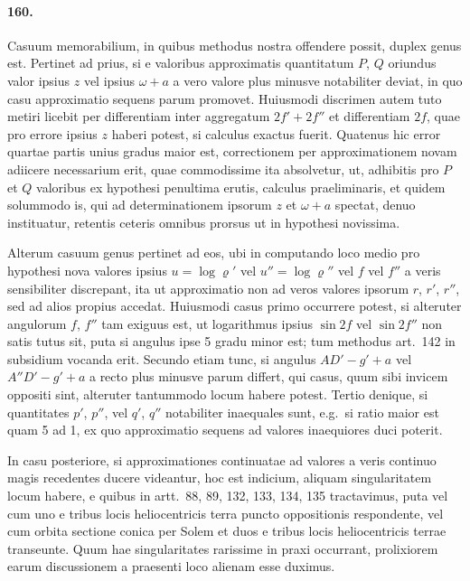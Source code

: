\documentclass[12pt,a4paper]{article}
\begin{document}
\paragraph{160.}
Casuum memorabilium, in quibus methodus nostra offendere possit, duplex genus est. Pertinet ad prius, si e valoribus approximatis quantitatum $P$, $Q$ oriundus valor ipsius $z$ vel ipsius $\omega + a$ a vero valore plus minusve notabiliter deviat, in quo casu approximatio sequens parum promovet. Huiusmodi discrimen autem tuto metiri licebit per differentiam inter aggregatum $2f' + 2f''$ et differentiam $2f$, quae pro errore ipsius $z$ haberi potest, si calculus exactus fuerit. Quatenus hic error quartae partis unius gradus maior est, correctionem per approximationem novam adiicere necessarium erit, quae commodissime ita absolvetur, ut, adhibitis pro $P$ et $Q$ valoribus ex hypothesi penultima erutis, calculus praeliminaris, et quidem solummodo is, qui ad determinationem ipsorum $z$ et $\omega + a$ spectat, denuo instituatur, retentis ceteris omnibus prorsus ut in hypothesi novissima.

Alterum casuum genus pertinet ad eos, ubi in computando loco medio pro hypothesi nova valores ipsius $u = \log\varrho'$ vel $u'' = \log\varrho''$ vel $f$ vel $f''$ a veris sensibiliter discrepant, ita ut approximatio non ad veros valores ipsorum $r$, $r'$, $r''$, sed ad alios propius accedat. Huiusmodi casus primo occurrere potest, si alteruter angulorum $f$, $f''$ tam exiguus est, ut logarithmus ipsius $\sin 2f$ vel $\sin 2f''$ non satis tutus sit, puta si angulus ipse 5 gradu minor est; tum methodus art.~142 in subsidium vocanda erit. Secundo etiam tunc, si angulus $AD' - g' + a$ vel $A''D' - g' + a$ a recto plus minusve parum differt, qui casus, quum sibi invicem oppositi sint, alteruter tantummodo locum habere potest. Tertio denique, si quantitates $p'$, $p''$, vel $q'$, $q''$ notabiliter inaequales sunt, e.g.~si ratio maior est quam 5 ad 1, ex quo approximatio sequens ad valores inaequiores duci poterit.

In casu posteriore, si approximationes continuatae ad valores a veris continuo magis recedentes ducere videantur, hoc est indicium, aliquam singularitatem locum habere, e quibus in artt.~88, 89, 132, 133, 134, 135 tractavimus, puta vel cum uno e tribus locis heliocentricis terra puncto oppositionis respondente, vel cum orbita sectione conica per Solem et duos e tribus locis heliocentricis terrae transeunte. Quum hae singularitates rarissime in praxi occurrant, prolixiorem earum discussionem a praesenti loco alienam esse duximus.
\end{document}
